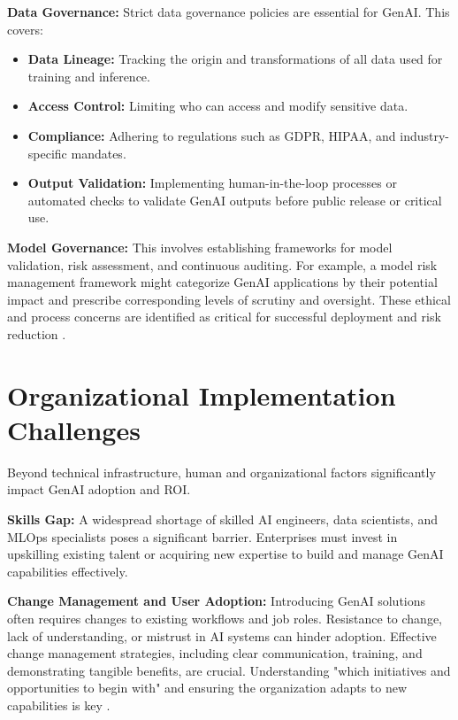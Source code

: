 \documentclass[10pt,twocolumn,letterpaper]{article}
\begin{document}
\textbf{Data Governance:} Strict data governance policies are essential for GenAI. This covers:
\begin{itemize}
  \item \textbf{Data Lineage:} Tracking the origin and transformations of all data used for training and inference.
  \item \textbf{Access Control:} Limiting who can access and modify sensitive data.
  \item \textbf{Compliance:} Adhering to regulations such as GDPR, HIPAA, and industry-specific mandates.
  \item \textbf{Output Validation:} Implementing human-in-the-loop processes or automated checks to validate GenAI outputs before public release or critical use.
\end{itemize}

\textbf{Model Governance:} This involves establishing frameworks for model validation, risk assessment, and continuous auditing. For example, a model risk management framework might categorize GenAI applications by their potential impact and prescribe corresponding levels of scrutiny and oversight. These ethical and process concerns are identified as critical for successful deployment and risk reduction \cite{openalex_w4400993506}.


\section{Organizational Implementation Challenges}


Beyond technical infrastructure, human and organizational factors significantly impact GenAI adoption and ROI.

\textbf{Skills Gap:} A widespread shortage of skilled AI engineers, data scientists, and MLOps specialists poses a significant barrier. Enterprises must invest in upskilling existing talent or acquiring new expertise to build and manage GenAI capabilities effectively.

\textbf{Change Management and User Adoption:} Introducing GenAI solutions often requires changes to existing workflows and job roles. Resistance to change, lack of understanding, or mistrust in AI systems can hinder adoption. Effective change management strategies, including clear communication, training, and demonstrating tangible benefits, are crucial. Understanding "which initiatives and opportunities to begin with" and ensuring the organization adapts to new capabilities is key \cite{openalex_w4400993506}.
\end{document}
